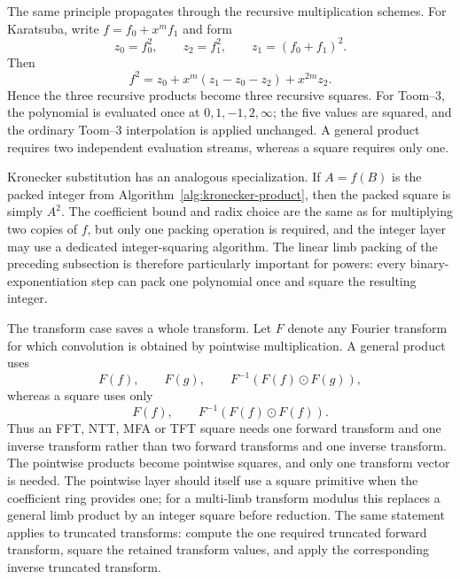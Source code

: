 \documentclass[11pt]{book}
\theoremstyle{definition}
\begin{document}
The same principle propagates through the recursive multiplication schemes.
For Karatsuba, write $f=f_0+x^m f_1$ and form
\[
 z_0=f_0^2,\qquad z_2=f_1^2,\qquad z_1=(f_0+f_1)^2.
\]
Then
\begin{equation}\label{eq:karatsuba-square}
 f^2=z_0+x^m(z_1-z_0-z_2)+x^{2m}z_2.
\end{equation}
Hence the three recursive products become three recursive squares.  For
Toom--3, the polynomial is evaluated once at
$0,1,-1,2,\infty$; the five values are squared, and the ordinary Toom--3
interpolation is applied unchanged.  A general product requires two
independent evaluation streams, whereas a square requires only one.

Kronecker substitution has an analogous specialization.  If $A=f(B)$ is the
packed integer from Algorithm~\ref{alg:kronecker-product}, then the packed
square is simply $A^2$.  The coefficient bound and radix choice are the same
as for multiplying two copies of $f$, but only one packing operation is
required, and the integer layer may use a dedicated integer-squaring
algorithm.  The linear limb packing of the preceding subsection is therefore
particularly important for powers: every binary-exponentiation step can pack
one polynomial once and square the resulting integer.

The transform case saves a whole transform.  Let $F$ denote any Fourier
transform for which convolution is obtained by pointwise multiplication.  A
general product uses
\[
  F(f),\qquad F(g),\qquad F^{-1}(F(f)\odot F(g)),
\]
whereas a square uses only
\begin{equation}\label{eq:fft-square}
  F(f),\qquad F^{-1}(F(f)\odot F(f)).
\end{equation}
Thus an FFT, NTT, MFA or TFT square needs one forward transform and one inverse
transform rather than two forward transforms and one inverse transform.  The
pointwise products become pointwise squares, and only one transform vector is
needed.  The pointwise layer should itself use a square primitive when the
coefficient ring provides one; for a multi-limb transform modulus this replaces
a general limb product by an integer square before reduction.  The same statement
applies to truncated transforms: compute the one
required truncated forward transform, square the retained transform values,
and apply the corresponding inverse truncated transform.
\end{document}
